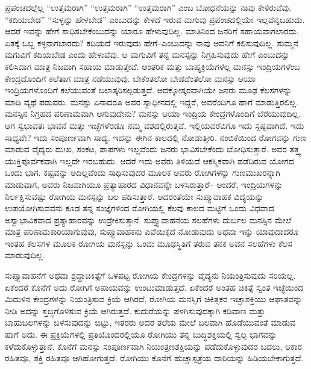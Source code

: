 ಪ್ರಪಂಚದಲ್ಲೆಲ್ಲ “ಉತ್ತಮರಾಗಿ” “ಉತ್ತಮರಾಗಿ” “ಉತ್ತಮರಾಗಿ” ಎಂಬ ಬೋಧನೆಯನ್ನು ನಾವು ಕೇಳಿರುವೆವು. “ಕದಿಯಬೇಡ” “ಸುಳ್ಳನ್ನು ಹೇಳಬೇಡ” ಎಂಬುದನ್ನು ಕೇಳದೆ ಇರುವ ಮಗುವು ಪ್ರಪಂಚದಲ್ಲಿಯೇ ಇಲ್ಲವೆನ್ನಬಹುದು. ಆದರೆ ಇವನ್ನು ಹೇಗೆ ಸಾಧಿಸಬೇಕೆಂಬುದನ್ನು ಯಾರೂ ಹೇಳುವುದಿಲ್ಲ. ಮಾತಿನಿಂದ ಜನರಿಗೆ ಸಹಾಯವಾಗಲಾರದು. ಏತಕ್ಕೆ ಒಬ್ಬ ಕಳ್ಳನಾಗಬಾರದು? ಕದಿಯದೆ ಇರುವುದು ಹೇಗೆ–ಎಂಬುದನ್ನು ನಾವು ಅವನಿಗೆ ಕಲಿಸುವುದಿಲ್ಲ. ಸುಮ್ಮನೆ ಮಗುವಿಗೆ ಕದಿಯಬೇಡ ಎಂದು ಹೇಳುವೆವು. ಆ ಮಗುವಿಗೆ ತನ್ನ ಮನಸ್ಸನ್ನು ನಿಗ್ರಹಿಸುವುದು ಹೇಗೆ ಎಂಬುದನ್ನು ಕಲಿಸಿದಾಗ ಮಾತ್ರ ನಿಜವಾಗಿ ಸಹಾಯ ಮಾಡುತ್ತೇವೆ. ಆಂತರಿಕ ಮತ್ತು ಬಾಹ್ಯಕ್ರಿಯೆಗಳೆಲ್ಲ ಮನಸ್ಸು ಇಂದ್ರಿಯಗಳೆಂಬ ಕೇಂದ್ರದೊಂದಿಗೆ ಕಲೆತಾಗ ಮಾತ್ರ ನಡೆಯುವುವು. ಬೇಕೆಂತಲೋ ಬೇಡವೆಂತಲೋ ಮನಸ್ಸು ಆಯಾ ಇಂದ್ರಿಯಗಳೊಂದಿಗೆ ಕಲೆಯುವಂತೆ ಬಲಾತ್ಕರಿಸಲ್ಪಡುತ್ತದೆ. ಅದಕ್ಕೋಸ್ಕರವಾಗಿಯೇ ಜನರು ಮೂಢ ಕೆಲಸಗಳನ್ನು ಮಾಡಿ ವ್ಯಥೆ ಪಡುವರು. ಮನಸ್ಸು ಏನಾದರೂ ಅವರ ಸ್ವಾಧೀನದಲ್ಲಿ ಇದ್ದರೆ, ಅವರೆಂದಿಗೂ ಹಾಗೆ ಮಾಡುತ್ತಿರಲಿಲ್ಲ. ಮನಸ್ಸಿನ ನಿಗ್ರಹದ ಪರಿಣಾಮವಾಗಿ ಆಗುವುದೇನು? ಮನಸ್ಸು ಆಯಾ ಇಂದ್ರಿಯ ಕೇಂದ್ರ\break ಗಳೊಂದಿಗೆ ಬೆರೆಯುವುದಿಲ್ಲ. ಆಗ ಸ್ವಭಾವತಃ ಭಾವನೆ ಮತ್ತು ಇಚ್ಛೆಗಳೆರಡೂ ನಮ್ಮ ವಶದಲ್ಲಿರುತ್ತವೆ. ಇಲ್ಲಿಯವರೆವಿಗೂ ಇದು ಸ್ಪಷ್ಟವಾಗಿದೆ. ಇದು ಸಾಧ್ಯವೇ? ಇದು ಸಂಪೂರ್ಣವಾಗಿ ಸಾಧ್ಯ. ಇದನ್ನು ಈಗಿನ ಕಾಲದಲ್ಲಿ ನೋಡುತ್ತೀರಿ. ನಂಬಿಕೆಯಿಂದ ರೋಗವನ್ನು ಗುಣ ಮಾಡುವ ವೈದ್ಯರು ದುಃಖ, ಸಂಕಟ, ಪಾಪಗಳು ಇಲ್ಲವೆಂದು ಜನರು ಭಾವಿಸಬೇಕೆಂದು ಬೋಧಿಸುತ್ತಾರೆ. ಅವರ ತತ್ತ್ವ ಯುಕ್ತಿಪೂರ್ವಕವಾಗಿ ಇಲ್ಲದೇ ಇರಬಹುದು. ಆದರೆ ಇದು ಅವರು ತಿಳಿಯದೆ ಆಕಸ್ಮಿಕವಾಗಿ ಪಡೆದಿರುವ ಯೋಗದ ಒಂದು ಭಾಗ. ಕಷ್ಟವನ್ನು ಅದಿಲ್ಲವೆಂದು ಸಾಧಿಸುವುದರ ಮೂಲಕ ಅವರು ರೋಗಿಗಳನ್ನು ಗುಣಮುಖರನ್ನಾಗಿ ಮಾಡುವಾಗ, ಅವರು ನಿಜವಾಗಿಯೂ ಪ್ರತ್ಯಾಹಾರದ ವಿಧಾನವನ್ನೇ ಬಳಸಿರುತ್ತಾರೆ– ಅಂದರೆ, ಇಂದ್ರಿಯಗಳನ್ನು ನಿರ್ಲಕ್ಷಿಸುವಷ್ಟು ರೋಗಿಯ ಮನಸ್ಸನ್ನು ಬಲ ಪಡಿಸುತ್ತಾರೆ. ಅದರಂತೆಯೇ ಸುಪ್ತ್ಯಾವಾಹಕ  ವಿದ್ಯೆಯನ್ನು ಉಪಯೋಗಿಸುವವನು ಕೂಡ ತನ್ನ ಸಂಜ್ಞೆಗಳಿಂದ ರೋಗಿಯಲ್ಲಿ ಕೆಲವು ಕಾಲದ ಮಟ್ಟಿಗೆ ಒಂದು ವಿಧವಾದ ಅಸ್ವಾಭಾವಿಕವಾದ ಪ್ರತ್ಯಾಹಾರವನ್ನು ಉದ್ರೇಕಿಸುತ್ತಾನೆ. ಸುಪ್ತ್ಯಾವಾಹನೆಯ ಸಲಹೆಗಳು ದುರ್ಬಲ ಮನಸ್ಸಿನ ಮೇಲೆ ಮಾತ್ರ ಪರಿಣಾಮಕಾರಿಯಾಗುವುವು, ಸುಪ್ತ್ಯಾವಾಹಕನು ಎವೆಯಿಕ್ಕದೆ ನೋಡುವುದು ಅಥವಾ ಇನ್ನು ಯಾವುದಾದರೂ ಇಂತಹ ಕೆಲಸಗಳ ಮೂಲಕ ರೋಗಿಯ ಮನಸ್ಸನ್ನು ಒಂದು ಮೂಢಸ್ಥಿತಿಗೆ ತರುವ ತನಕ ಅವನ ಸಲಹೆಗಳು ಕೆಲಸ ಮಾಡುವುದಿಲ್ಲ. 

\vskip 6pt

ಸುಪ್ತ್ಯಾವಾಹನೆಗೆ ಅಥವಾ ಶ್ರದ್ಧಾಚಿಕಿತ್ಸೆಗೆ ಒಳಪಟ್ಟ ರೋಗಿಯ ಕೇಂದ್ರಗಳನ್ನು ವೈದ್ಯನು ನಿಯಂತ್ರಿಸುವುದು ಸರಿಯಲ್ಲ. ಏಕೆಂದರೆ ಕೊನೆಗೆ ಅದು ರೋಗಿಗೆ ಅಪಾಯವನ್ನು ಉಂಟುಮಾಡುತ್ತದೆ. ಏಕೆಂದರೆ ಅಂತಹ ಚಿಕಿತ್ಸೆ ಸ್ವಂತ ಇಚ್ಛೆಯಿಂದ ಮಿದುಳಿನ ಕೇಂದ್ರಗಳನ್ನು ನಿಯಂತ್ರಿಸುವ ಕ್ರಿಯೆ ಆಗಿರದೆ, ರೋಗಿಯ ಮನಸ್ಸಿಗೆ ಚಿಕಿತ್ಸಕರ ಇಚ್ಛಾಶಕ್ತಿಯು ಆಘಾತವನ್ನು ನೀಡಿ ಅದನ್ನು ಸ್ತಬ್ಧಗೊಳಿಸುವ ಕ್ರಿಯೆ ಆಗಿರುತ್ತದೆ. ಕುದುರೆಯನ್ನು ಪಳಗಿಸುವುದಕ್ಕಾಗಿ ಕಡಿವಾಣ ಮತ್ತು ಬಾಹುಬಲಗಳನ್ನು ಬಳಸುವುದನ್ನು ಬಿಟ್ಟು, ಇತರರು ಅದರ ತಲೆಯ ಮೇಲೆ ಬಲವಾಗಿ ಹೊಡೆಯುವಂತೆ ಮಾಡುವ ಹಾಗೆ ಅದು. ಈ ಪ್ರಕ್ರಿಯೆಗಳಲ್ಲಿ ಪ್ರತಿಯೊಂದರಲ್ಲಿಯೂ ರೋಗಿಯು ತನ್ನ ಬುದ್ಧಿಶಕ್ತಿಯಲ್ಲಿ ಸ್ವಲ್ಪ ಭಾಗವನ್ನು ಕಳೆದುಕೊಳ್ಳುತ್ತಾನೆ. ಕೊನೆಗೆ ಮನಸ್ಸು ಸಂಪೂರ್ಣವಾಗಿ ನಿಯಂತ್ರಣಶಕ್ತಿಯನ್ನು ಪಡೆದುಕೊಳ್ಳುವುದರ ಬದಲು, ಆಕಾರ ರಹಿತವೂ, ಶಕ್ತಿ ರಹಿತವೂ ಆಗಿಹೋಗುತ್ತದೆ. ರೋಗಿಯು ಕೊನೆಗೆ ಹುಚ್ಚಾಸ್ಪತ್ರೆಯ ದಾರಿಯನ್ನು ಹಿಡಿಯಬೇಕಾಗುತ್ತದೆ. 

